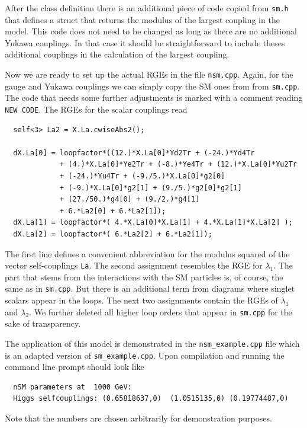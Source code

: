 \documentclass[11pt,a4paper]{article}
\begin{document}
After the class definition there is an additional piece of code copied from \texttt{sm.h} that defines a struct that returns the modulus of the largest coupling in the model. This code does not need to be changed as long as there are no additional Yukawa couplings. In that case it should be straightforward to include theses additional couplings in the calculation of the largest coupling.

Now we are ready to set up the actual RGEs in the file \texttt{nsm.cpp}. Again, for the gauge and Yukawa couplings we can simply copy the SM ones from from \texttt{sm.cpp}. The code that needs some further adjustments is marked with a comment reading \texttt{NEW CODE}. The RGEs for the scalar couplings read
\begin{lstlisting}
  self<3> La2 = X.La.cwiseAbs2();

  dX.La[0] = loopfactor*((12.)*X.La[0]*Yd2Tr + (-24.)*Yd4Tr
             + (4.)*X.La[0]*Ye2Tr + (-8.)*Ye4Tr + (12.)*X.La[0]*Yu2Tr
             + (-24.)*Yu4Tr + (-9./5.)*X.La[0]*g2[0]
             + (-9.)*X.La[0]*g2[1] + (9./5.)*g2[0]*g2[1]
             + (27./50.)*g4[0] + (9./2.)*g4[1]
             + 6.*La2[0] + 6.*La2[1]);
  dX.La[1] = loopfactor*( 4.*X.La[0]*X.La[1] + 4.*X.La[1]*X.La[2] );
  dX.La[2] = loopfactor*( 6.*La2[2] + 6.*La2[1]);
\end{lstlisting}
The first line defines a convenient abbreviation for the modulus squared of the vector self-couplings \texttt{La}. The second assignment resembles the RGE for $\lambda_1$. The part that stems from the interactions with the SM particles is, of course, the same as in \texttt{sm.cpp}. But there is an additional term from diagrams where singlet scalars appear in the loops. The next two assignments contain the RGEs of $\lambda_1$ and $\lambda_2$. We further deleted all higher loop orders that appear in \texttt{sm.cpp} for the sake of transparency.

The application of this model is demonstrated in the \texttt{nsm\_example.cpp} file which is an adapted version of \texttt{sm\_example.cpp}. Upon compilation and running the command line prompt should look like
\begin{lstlisting}
  nSM parameters at  1000 GeV:
  Higgs selfcouplings: (0.65818637,0)  (1.0515135,0) (0.19774487,0)
\end{lstlisting}
Note that the numbers are chosen arbitrarily for demonstration purposes.
\end{document}
